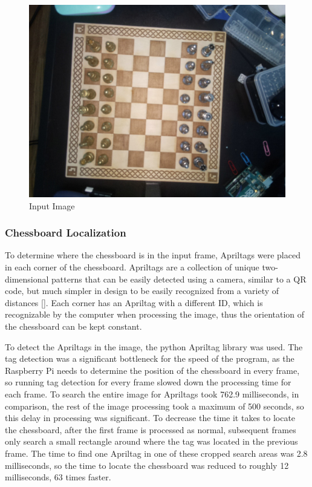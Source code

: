 \documentclass[journal]{IEEEtran}
\begin{document}
\begin{figure}[!ht]
	\centering
	\includegraphics[width=\linewidth]{Images/InputImage.jpg}
	\caption{Input Image}
	\label{input}
\end{figure}

\vspace{12pt}

\subsubsection{Chessboard Localization}
To determine where the chessboard is in the input frame, Apriltags were placed in each corner of the chessboard. Apriltags are a collection of unique two-dimensional patterns that can be easily detected using a camera, similar to a QR code, but much simpler in design to be easily recognized from a variety of distances [\cite{Wang2016}]. Each corner has an Apriltag with a different ID, which is recognizable by the computer when processing the image, thus the orientation of the chessboard can be kept constant.

To detect the Apriltags in the image, the python Apriltag library was used.
The tag detection was a significant bottleneck for the speed of the program, as the Raspberry Pi needs to determine the position of the chessboard in every frame, so running tag detection for every frame slowed down the processing time for each frame. To search the entire image for Apriltags took 762.9 milliseconds, in comparison, the rest of the image processing took a maximum of 500 seconds, so this delay in processing was significant.
To decrease the time it takes to locate the chessboard, after the first frame is processed as normal, subsequent frames only search a small rectangle around where the tag was located in the previous frame. The time to find one Apriltag in one of these cropped search areas was 2.8 milliseconds, so the time to locate the chessboard was reduced to roughly 12 milliseconds, 63 times faster.
\end{document}
